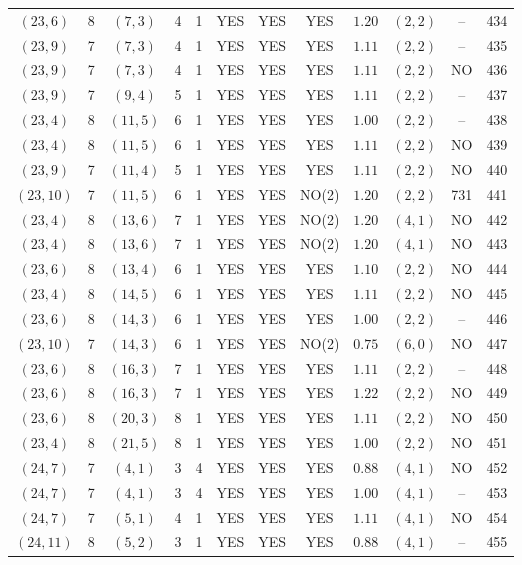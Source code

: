 \begin{longtable}{|c|c|c|c|c|c|c|c|c|c|c|c|}
$(23,6)$ & 8 & $(7,3)$ & 4 & 1 & YES & YES & YES & $1.20$ & $(2,2)$ & -- & 434\\
$(23,9)$ & 7 & $(7,3)$ & 4 & 1 & YES & YES & YES & $1.11$ & $(2,2)$ & -- & 435\\
$(23,9)$ & 7 & $(7,3)$ & 4 & 1 & YES & YES & YES & $1.11$ & $(2,2)$ & NO & 436\\
$(23,9)$ & 7 & $(9,4)$ & 5 & 1 & YES & YES & YES & $1.11$ & $(2,2)$ & -- & 437\\
$(23,4)$ & 8 & $(11,5)$ & 6 & 1 & YES & YES & YES & $1.00$ & $(2,2)$ & -- & 438\\
$(23,4)$ & 8 & $(11,5)$ & 6 & 1 & YES & YES & YES & $1.11$ & $(2,2)$ & NO & 439\\
$(23,9)$ & 7 & $(11,4)$ & 5 & 1 & YES & YES & YES & $1.11$ & $(2,2)$ & NO & 440\\
$(23,10)$ & 7 & $(11,5)$ & 6 & 1 & YES & YES & NO(2) & $1.20$ & $(2,2)$ & 731 & 441\\
$(23,4)$ & 8 & $(13,6)$ & 7 & 1 & YES & YES & NO(2) & $1.20$ & $(4,1)$ & NO & 442\\
$(23,4)$ & 8 & $(13,6)$ & 7 & 1 & YES & YES & NO(2) & $1.20$ & $(4,1)$ & NO & 443\\
$(23,6)$ & 8 & $(13,4)$ & 6 & 1 & YES & YES & YES & $1.10$ & $(2,2)$ & NO & 444\\
$(23,4)$ & 8 & $(14,5)$ & 6 & 1 & YES & YES & YES & $1.11$ & $(2,2)$ & NO & 445\\
$(23,6)$ & 8 & $(14,3)$ & 6 & 1 & YES & YES & YES & $1.00$ & $(2,2)$ & -- & 446\\
$(23,10)$ & 7 & $(14,3)$ & 6 & 1 & YES & YES & NO(2) & $0.75$ & $(6,0)$ & NO & 447\\
$(23,6)$ & 8 & $(16,3)$ & 7 & 1 & YES & YES & YES & $1.11$ & $(2,2)$ & -- & 448\\
$(23,6)$ & 8 & $(16,3)$ & 7 & 1 & YES & YES & YES & $1.22$ & $(2,2)$ & NO & 449\\
$(23,6)$ & 8 & $(20,3)$ & 8 & 1 & YES & YES & YES & $1.11$ & $(2,2)$ & NO & 450\\
$(23,4)$ & 8 & $(21,5)$ & 8 & 1 & YES & YES & YES & $1.00$ & $(2,2)$ & NO & 451\\
$(24,7)$ & 7 & $(4,1)$ & 3 & 4 & YES & YES & YES & $0.88$ & $(4,1)$ & NO & 452\\
$(24,7)$ & 7 & $(4,1)$ & 3 & 4 & YES & YES & YES & $1.00$ & $(4,1)$ & -- & 453\\
$(24,7)$ & 7 & $(5,1)$ & 4 & 1 & YES & YES & YES & $1.11$ & $(4,1)$ & NO & 454\\
$(24,11)$ & 8 & $(5,2)$ & 3 & 1 & YES & YES & YES & $0.88$ & $(4,1)$ & -- & 455\\

\end{longtable}
